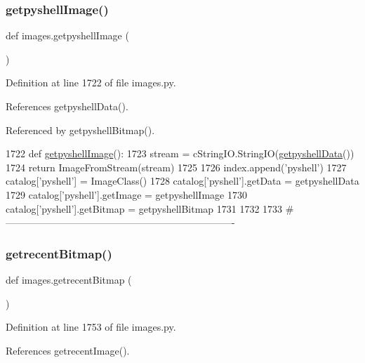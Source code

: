 \subsubsection{\texorpdfstring{getpyshell\+Image()}{getpyshellImage()}}
{\footnotesize\ttfamily def images.\+getpyshell\+Image (\begin{DoxyParamCaption}{ }\end{DoxyParamCaption})}



Definition at line 1722 of file images.\+py.



References getpyshell\+Data().



Referenced by getpyshell\+Bitmap().


\begin{DoxyCode}
1722 \textcolor{keyword}{def }\hyperlink{namespaceimages_a9ea41392546f608f23ba3f4674061fa3}{getpyshellImage}():
1723     stream = cStringIO.StringIO(\hyperlink{namespaceimages_a93fd0751fa8042ffd073aea24eb2dec0}{getpyshellData}())
1724     \textcolor{keywordflow}{return} ImageFromStream(stream)
1725 
1726 index.append(\textcolor{stringliteral}{'pyshell'})
1727 catalog[\textcolor{stringliteral}{'pyshell'}] = ImageClass()
1728 catalog[\textcolor{stringliteral}{'pyshell'}].getData = getpyshellData
1729 catalog[\textcolor{stringliteral}{'pyshell'}].getImage = getpyshellImage
1730 catalog[\textcolor{stringliteral}{'pyshell'}].getBitmap = getpyshellBitmap
1731 
1732 
1733 \textcolor{comment}{#----------------------------------------------------------------------}
\end{DoxyCode}
\mbox{\label{namespaceimages_ae7e23a7d49c169647126d3c9e2b3eb0f}} 
\subsubsection{\texorpdfstring{getrecent\+Bitmap()}{getrecentBitmap()}}
{\footnotesize\ttfamily def images.\+getrecent\+Bitmap (\begin{DoxyParamCaption}{ }\end{DoxyParamCaption})}



Definition at line 1753 of file images.\+py.



References getrecent\+Image().


